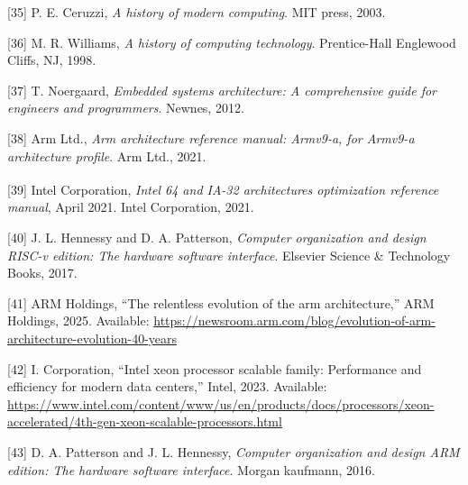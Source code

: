 \documentclass[12pt,oneside]{templates/unerthesis}
\newcommand{\CSLLeftMargin}[1]{#1} %
\newcommand{\CSLRightInline}[1]{#1} %
\newlength{\cslhangindent}
\newenvironment{CSLReferences}[2] %
 {\setlength{\parindent}{0pt}%
  \setlength{\leftskip}{#1 pt\relax}%
  \setlength{\parskip}{#2 pt\relax}%
  \everypar{\setlength{\hangindent}{\cslhangindent}}}
 {\par}
\begin{document}
\begin{CSLReferences}{0}{0}
\leavevmode{}%
\CSLLeftMargin{{[}35{]} }%
\CSLRightInline{P. E. Ceruzzi, \emph{A history of modern computing}. MIT press, 2003.}

\leavevmode{}%
\CSLLeftMargin{{[}36{]} }%
\CSLRightInline{M. R. Williams, \emph{A history of computing technology}. Prentice-Hall Englewood Cliffs, NJ, 1998.}

\leavevmode{}%
\CSLLeftMargin{{[}37{]} }%
\CSLRightInline{T. Noergaard, \emph{Embedded systems architecture: A comprehensive guide for engineers and programmers}. Newnes, 2012.}

\leavevmode{}%
\CSLLeftMargin{{[}38{]} }%
\CSLRightInline{Arm Ltd., \emph{Arm architecture reference manual: Armv9-a, for Armv9-a architecture profile}. Arm Ltd., 2021.}

\leavevmode{}%
\CSLLeftMargin{{[}39{]} }%
\CSLRightInline{Intel Corporation, \emph{Intel\textsuperscript{\textregistered} 64 and IA-32 architectures optimization reference manual}, April 2021. Intel Corporation, 2021.}

\leavevmode{}%
\CSLLeftMargin{{[}40{]} }%
\CSLRightInline{J. L. Hennessy and D. A. Patterson, \emph{Computer organization and design RISC-v edition: The hardware software interface}. Elsevier Science \& Technology Books, 2017.}

\leavevmode{}%
\CSLLeftMargin{{[}41{]} }%
\CSLRightInline{ARM Holdings, {``The relentless evolution of the arm architecture,''} ARM Holdings, 2025. Available: \url{https://newsroom.arm.com/blog/evolution-of-arm-architecture-evolution-40-years}}

\leavevmode{}%
\CSLLeftMargin{{[}42{]} }%
\CSLRightInline{I. Corporation, {``Intel xeon processor scalable family: Performance and efficiency for modern data centers,''} Intel, 2023. Available: \url{https://www.intel.com/content/www/us/en/products/docs/processors/xeon-accelerated/4th-gen-xeon-scalable-processors.html}}

\leavevmode{}%
\CSLLeftMargin{{[}43{]} }%
\CSLRightInline{D. A. Patterson and J. L. Hennessy, \emph{Computer organization and design ARM edition: The hardware software interface}. Morgan kaufmann, 2016.}


\end{CSLReferences}
\end{document}
